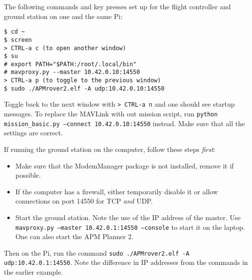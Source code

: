 \documentclass{article}
\begin{document}
The following commands and key presses set up for the flight controller and 
ground station on one and the same Pi:

\begin{verbatim}
$ cd ~
$ screen
> CTRL-a c (to open another window)
$ su
# export PATH="$PATH:/root/.local/bin"
# mavproxy.py --master 10.42.0.10:14550
> CTRL-a p (to toggle to the previous window)
$ sudo ./APMrover2.elf -A udp:10.42.0.10:14550
\end{verbatim}

Toggle back to the next window with {\tt > CTRL-a n} and one should see startup 
messages. To replace the MAVLink with out mission script, run {\tt python 
mission\_basic.py --connect 10.42.0.10:14550} instead. Make sure that all the 
settings are correct.

If running the ground station on the computer, follow these steps {\it first}:
\begin{itemize}
  \item Make sure that the ModemManager package is not installed, remove it if 
        possible.
  \item If the computer has a firewall, either temporarily disable it or allow 
        connections on port 14550 for TCP {\it and} UDP.
  \item Start the ground station. Note the use of the IP address of the master. 
        Use {\tt mavproxy.py --master 10.42.0.1:14550 --console} to start it on 
        the laptop. One can also start the APM Planner 2.
\end{itemize}

Then on the Pi, run the command {\tt sudo ./APMrover2.elf -A 
udp:10.42.0.1:14550}. Note the difference in IP addresses from the commands in 
the earlier example.
\end{document}
